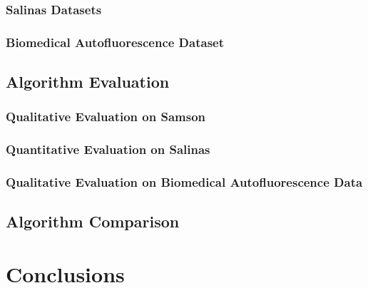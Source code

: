 \documentclass[10pt]{article}
\begin{document}
\subsubsection{Salinas Datasets}
\subsubsection{Biomedical Autofluorescence Dataset}

\clearpage
\subsection{Algorithm Evaluation}
\subsubsection{Qualitative Evaluation on Samson}
\subsubsection{Quantitative Evaluation on Salinas}
\subsubsection{Qualitative Evaluation on Biomedical Autofluorescence Data}

\clearpage
\subsection{Algorithm Comparison}

\clearpage
% 
% 
% 
% 
% 

\clearpage
% 
% 
% 
% 
% 
\section{Conclusions}
\end{document}
